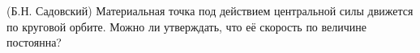 (Б.Н. Садовский)
Материальная точка под действием центральной силы движется по круговой
орбите. Можно ли утверждать, что её скорость по величине постоянна?
